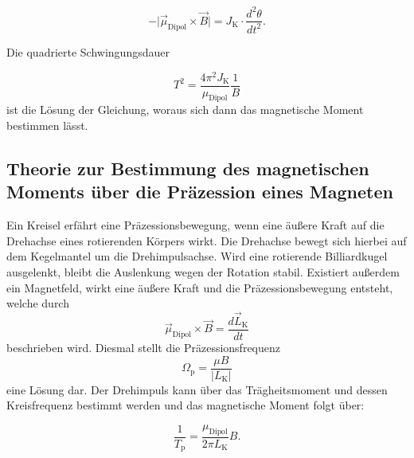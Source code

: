 \begin{equation}
    - \bigl|\vec{\mu}_\text{Dipol} \times \vec{B}\bigr| = J_\text{K} \cdot \frac{d^2\theta}{dt^2}.
\end{equation}

\noindent Die quadrierte Schwingungsdauer

 \begin{equation}
   T^2 = \frac{4\pi^2 J_\text{K}}{\mu_\text{Dipol}} \frac{1}{B}
\end{equation}
ist die Lösung der Gleichung, woraus sich dann das magnetische Moment bestimmen lässt.

\subsection{Theorie zur Bestimmung des magnetischen Moments über die Präzession eines Magneten}
Ein Kreisel erfährt eine Präzessionsbewegung, wenn eine äußere Kraft auf die Drehachse eines rotierenden Körpers wirkt.
Die Drehachse bewegt sich hierbei auf dem Kegelmantel um die Drehimpulsachse.
Wird eine rotierende Billiardkugel ausgelenkt, bleibt die Auslenkung wegen der Rotation stabil.
Existiert außerdem ein Magnetfeld, wirkt eine äußere Kraft und die Präzessionsbewegung entsteht, welche durch
\begin{equation}
    \vec{\mu}_\text{Dipol} \times \vec{B} = \frac{d\vec{L}_\text{K}}{dt}
\end{equation}
beschrieben wird. Diesmal stellt die Präzessionsfrequenz
\begin{equation}
\Omega_\text{p} = \frac{\mu B}{\bigl|L_\text{K}\bigr|}
\end{equation}
eine Lösung dar. Der Drehimpuls kann über das Trägheitsmoment und dessen Kreisfrequenz bestimmt werden und das magnetische Moment folgt über:

\begin{equation}
\frac{1}{T_\text{p}} = \frac{\mu_\text{Dipol}}{2\pi L_\text{K}} B.
\end{equation}
